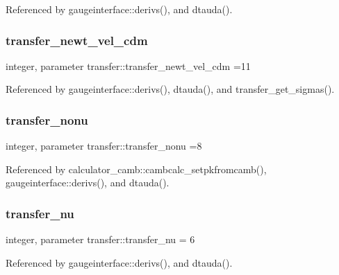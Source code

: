 Referenced by gaugeinterface\+::derivs(), and dtauda().

\mbox{\label{namespacetransfer_acac3c3e5a8b36cd08ca97ca40bd92fcc}} 
\subsubsection{\texorpdfstring{transfer\+\_\+newt\+\_\+vel\+\_\+cdm}{transfer\_newt\_vel\_cdm}}
{\footnotesize\ttfamily integer, parameter transfer\+::transfer\+\_\+newt\+\_\+vel\+\_\+cdm =11}



Referenced by gaugeinterface\+::derivs(), dtauda(), and transfer\+\_\+get\+\_\+sigmas().

\mbox{\label{namespacetransfer_aa028f75ae9a421f87ff8e2ebbfb88e73}} 
\subsubsection{\texorpdfstring{transfer\+\_\+nonu}{transfer\_nonu}}
{\footnotesize\ttfamily integer, parameter transfer\+::transfer\+\_\+nonu =8}



Referenced by calculator\+\_\+camb\+::cambcalc\+\_\+setpkfromcamb(), gaugeinterface\+::derivs(), and dtauda().

\mbox{\label{namespacetransfer_a88f1f472755284c745f4f9627f3385f3}} 
\subsubsection{\texorpdfstring{transfer\+\_\+nu}{transfer\_nu}}
{\footnotesize\ttfamily integer, parameter transfer\+::transfer\+\_\+nu = 6}



Referenced by gaugeinterface\+::derivs(), and dtauda().

\mbox{\label{namespacetransfer_abd233741f7f81807122709afee55d2f2}} 
